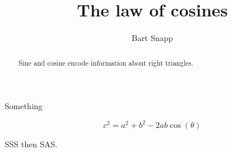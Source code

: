 \documentclass[noauthor,nooutcomes,12pt]{ximera}
\title{The law of cosines}
\author{Bart Snapp}
\begin{document}
\begin{abstract}
  Sine and cosine encode information about right triangles.
\end{abstract}
\maketitle

\begin{listOutcomes}
\item Something
\end{listOutcomes}
\mynewpage




\begin{question}
  \[
  c^2 = a^2 + b^2 - 2ab\cos(\theta)
  \]
  
  
\end{question}
\mynewpage

\begin{question}
  SSS then SAS.
  
  
\end{question}
\mynewpage
\end{document}
